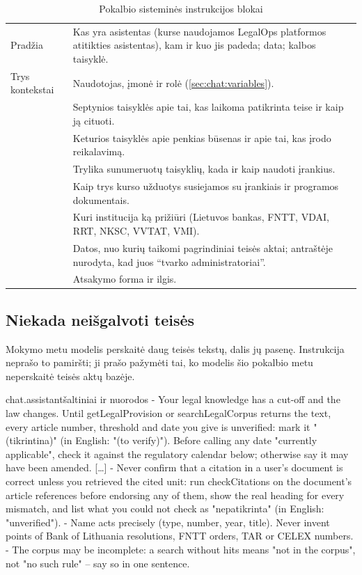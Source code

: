 \begin{table}[H]
\caption{Pokalbio sisteminės instrukcijos blokai}\label{tab:chat:blocks}
\begin{tabularx}{\textwidth}{@{}L{42mm}Y@{}}
\toprule
{} &  \\
\midrule
Pradžia & Kas yra asistentas (kurse naudojamos LegalOps platformos atitikties asistentas), kam ir kuo jis padeda; data; kalbos taisyklė. \\
Trys kontekstai & Naudotojas, įmonė ir rolė (\cref{sec:chat:variables}). \\
 & Septynios taisyklės apie tai, kas laikoma patikrinta teise ir kaip ją cituoti. \\
 & Keturios taisyklės apie penkias būsenas ir apie tai, kas įrodo reikalavimą. \\
 & Trylika sunumeruotų taisyklių, kada ir kaip naudoti įrankius. \\
 & Kaip trys kurso užduotys susiejamos su įrankiais ir programos dokumentais. \\
 & Kuri institucija ką prižiūri (Lietuvos bankas, FNTT, VDAI, RRT, NKSC, VVTAT, VMI). \\
 & Datos, nuo kurių taikomi pagrindiniai teisės aktai; antraštėje nurodyta, kad juos \enquote{tvarko administratoriai}. \\
 & Atsakymo forma ir ilgis. \\
\bottomrule
\end{tabularx}
\end{table}

\subsection{Niekada neišgalvoti teisės}

Mokymo metu modelis perskaitė daug teisės tekstų, dalis jų pasenę. Instrukcija neprašo to pamiršti;
ji prašo pažymėti tai, ko modelis šio pokalbio metu neperskaitė teisės aktų bazėje.

\begin{promptexcerpt}{chat.assistant}{šaltiniai ir nuorodos}
- Your legal knowledge has a cut-off and the law changes. Until getLegalProvision or searchLegalCorpus returns the text, every article number, threshold and date you give is unverified: mark it "(tikrintina)" (in English: "(to verify)"). Before calling any date "currently applicable", check it against the regulatory calendar below; otherwise say it may have been amended.
[…]
- Never confirm that a citation in a user's document is correct unless you retrieved the cited unit: run checkCitations on the document's article references before endorsing any of them, show the real heading for every mismatch, and list what you could not check as "nepatikrinta" (in English: "unverified").
- Name acts precisely (type, number, year, title). Never invent points of Bank of Lithuania resolutions, FNTT orders, TAR or CELEX numbers.
- The corpus may be incomplete: a search without hits means "not in the corpus", not "no such rule" – say so in one sentence.
\end{promptexcerpt}

